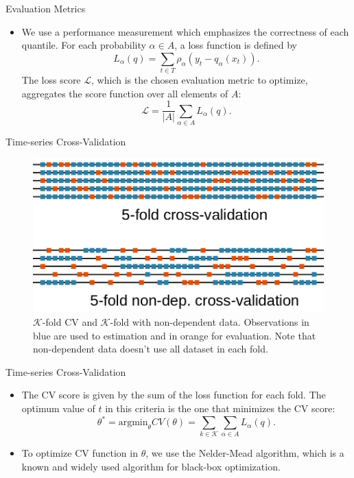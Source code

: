 \documentclass[11pt]{beamer}
\begin{document}
\begin{frame}{Evaluation Metrics}

\begin{itemize}

\item
We use a performance measurement which emphasizes the correctness of
each quantile. For each probability \(\alpha \in A\), a loss function
is defined by
\[L_\alpha(q)= \sum_{t\in T}\rho_{\alpha}(y_{t}-q_{\alpha}(x_t)).\]
The loss score \(\mathcal{L}\), which is the chosen evaluation metric
to optimize, aggregates the score function over all elements of \(A\):
\[\mathcal{L}= \frac{1}{|A|}\sum_{\alpha \in A}L_\alpha(q).\]
\end{itemize}

\end{frame}

\begin{frame}{Time-series Cross-Validation}

\begin{figure}
\centering
\includegraphics[width=0.9\linewidth]{Images/Cross-validation-scheme}
\caption{$\mathcal{K}$-fold CV and $\mathcal{K}$-fold with non-dependent data. Observations in blue are used to estimation and in orange for evaluation. Note that non-dependent data doesn't use all dataset in each fold.}
\label{fig:cross-validation-scheme}
\end{figure}

\end{frame}

\begin{frame}{Time-series Cross-Validation}

\begin{itemize}

\item
The CV score is given by the sum of the loss function for each fold.
The optimum value of \(t\) in this criteria is the one that minimizes
the CV score: \[
\theta^* = \text{argmin}_\theta CV(\theta) = \sum_{k \in \mathcal{K}} \sum_{\alpha \in A} L_\alpha(q).
\]
\item
To optimize CV function in \(\theta\), we use the Nelder-Mead
algorithm, which is a known and widely used algorithm for black-box
optimization.
\end{itemize}

\end{frame}
\end{document}
